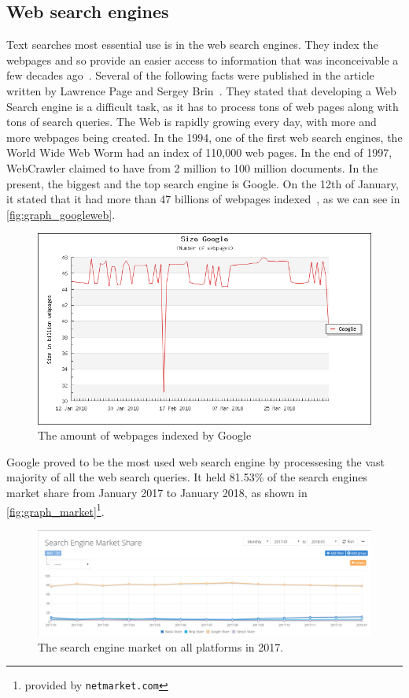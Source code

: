 \subsection{Web search engines}
Text searches most essential use is in the web search engines. They index the webpages and so provide an easier access to information that was inconceivable a few decades ago~\cite{invertedfiles}. Several of the following facts were published in the article written by Lawrence Page and Sergey Brin~\cite{google}.
They stated that developing a Web Search engine is a difficult task, as it has to process tons of web pages along with tons of search queries. The Web is rapidly growing every day, with more and more webpages being created. In the 1994, one of the first web search engines, the World Wide Web Worm had an index of 110,000 web pages. In the end of 1997, WebCrawler claimed to have from 2 million to 100 million documents. In the present, the biggest and the top search engine is Google. On the 12th of January, it stated that it had more than 47 billions of webpages indexed~\cite{wwwstats}, as we can see in \autoref{fig:graph_googleweb}. 
\begin{figure}
\centering
\includegraphics[width=.8\textwidth]{img/google_webpages.png}
\caption{The amount of webpages indexed by Google}
\label{fig:graph_googleweb}
\end{figure}
Google proved to be the most used web search engine by processesing the vast majority of all the web search queries. It held 81.53\% of the search engines market share from January 2017 to January 2018, as shown in \autoref{fig:graph_market}\footnote{provided by \texttt{netmarket.com}}.
\begin{figure}
\centering
\includegraphics[width=.8\textwidth]{img/search_engine_market.png}
\caption{The search engine market on all platforms in 2017.}
\label{fig:graph_market}
\end{figure}

